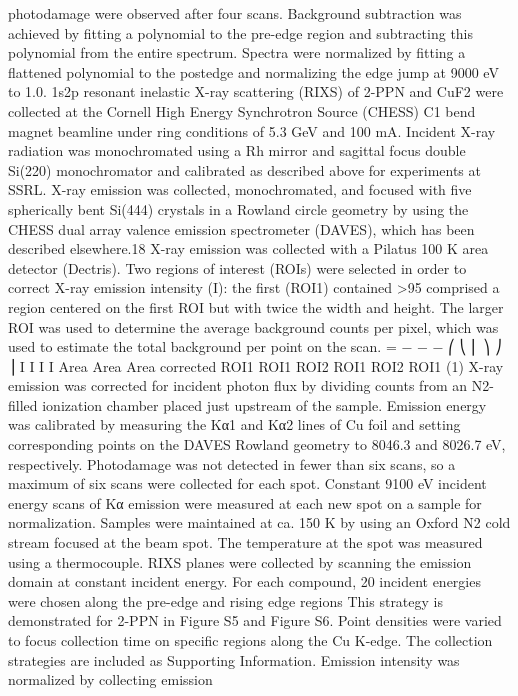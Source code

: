 photodamage were observed after four scans. Background subtraction
was achieved by ﬁtting a polynomial to the pre-edge region and
subtracting this polynomial from the entire spectrum. Spectra were
normalized by ﬁtting a ﬂattened polynomial to the postedge and
normalizing the edge jump at 9000 eV to 1.0.
1s2p resonant inelastic X-ray scattering (RIXS) of 2-PPN and CuF2
were collected at the Cornell High Energy Synchrotron Source
(CHESS) C1 bend magnet beamline under ring conditions of 5.3 GeV
and 100 mA. Incident X-ray radiation was monochromated using a Rh
mirror and sagittal focus double Si(220) monochromator and
calibrated as described above for experiments at SSRL. X-ray emission
was collected, monochromated, and focused with ﬁve spherically bent
Si(444) crystals in a Rowland circle geometry by using the CHESS
dual array valence emission spectrometer (DAVES), which has been
described elsewhere.18 X-ray emission was collected with a Pilatus 100
K area detector (Dectris). Two regions of interest (ROIs) were
selected in order to correct X-ray emission intensity (I): the ﬁrst
(ROI1) contained >95%
comprised a region centered on the ﬁrst ROI but with twice the width
and height. The larger ROI was used to determine the average
background counts per pixel, which was used to estimate the total
background per point on the scan.
=
−
−
−
⎛
⎝
⎜
⎞
⎠
⎟
I
I
I
I
Area
Area
Area
corrected
ROI1
ROI1
ROI2
ROI1
ROI2
ROI1
(1)
X-ray emission was corrected for incident photon ﬂux by dividing
counts from an N2-ﬁlled ionization chamber placed just upstream of
the sample.
Emission energy was calibrated by measuring the Kα1 and Kα2 lines
of Cu foil and setting corresponding points on the DAVES Rowland
geometry to 8046.3 and 8026.7 eV, respectively. Photodamage was not
detected in fewer than six scans, so a maximum of six scans were
collected for each spot. Constant 9100 eV incident energy scans of Kα
emission were measured at each new spot on a sample for
normalization. Samples were maintained at ca. 150 K by using an
Oxford N2 cold stream focused at the beam spot. The temperature at
the spot was measured using a thermocouple.
RIXS planes were collected by scanning the emission domain at
constant incident energy. For each compound, 20 incident energies
were chosen along the pre-edge and rising edge regions This strategy is
demonstrated for 2-PPN in Figure S5 and Figure S6. Point densities
were varied to focus collection time on speciﬁc regions along the Cu
K-edge. The collection strategies are included as Supporting
Information. Emission intensity was normalized by collecting emission
